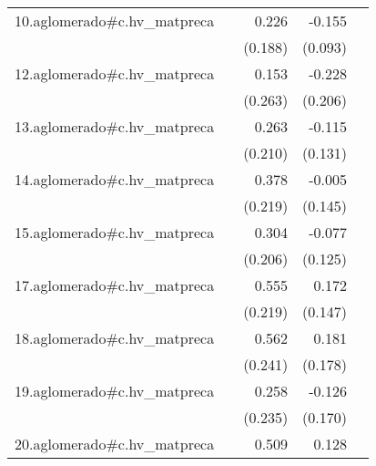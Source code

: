 {\begin{longtable}{l*{4}{D{.}{.}{-1}}}
\addlinespace
10.aglomerado#c.hv\_matpreca&                     &       0.226         &      -0.155         &                     \\
            &                     &     (0.188)         &     (0.093)         &                     \\
\addlinespace
12.aglomerado#c.hv\_matpreca&                     &       0.153         &      -0.228         &                     \\
            &                     &     (0.263)         &     (0.206)         &                     \\
\addlinespace
13.aglomerado#c.hv\_matpreca&                     &       0.263         &      -0.115         &                     \\
            &                     &     (0.210)         &     (0.131)         &                     \\
\addlinespace
14.aglomerado#c.hv\_matpreca&                     &       0.378         &      -0.005         &                     \\
            &                     &     (0.219)         &     (0.145)         &                     \\
\addlinespace
15.aglomerado#c.hv\_matpreca&                     &       0.304         &      -0.077         &                     \\
            &                     &     (0.206)         &     (0.125)         &                     \\
\addlinespace
17.aglomerado#c.hv\_matpreca&                     &       0.555\sym{*}  &       0.172         &                     \\
            &                     &     (0.219)         &     (0.147)         &                     \\
\addlinespace
18.aglomerado#c.hv\_matpreca&                     &       0.562\sym{*}  &       0.181         &                     \\
            &                     &     (0.241)         &     (0.178)         &                     \\
\addlinespace
19.aglomerado#c.hv\_matpreca&                     &       0.258         &      -0.126         &                     \\
            &                     &     (0.235)         &     (0.170)         &                     \\
\addlinespace
20.aglomerado#c.hv\_matpreca&                     &       0.509         &       0.128         &                     \\

\end{longtable}}
